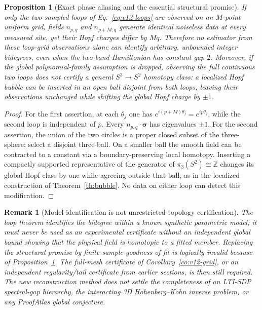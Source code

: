 \documentclass[aps,prd,onecolumn,notitlepage,11pt,superscriptaddress,longbibliography]{revtex4-2}
\newtheorem{proposition}{Proposition}
\newtheorem{remark}{Remark}
\begin{document}
\begin{proposition}[Exact phase aliasing and the essential structural promise]\label{prop:v12-alias}
If only the two sampled loops of Eq.~\eqref{eq:v12-loops} are observed on an $M$-point uniform grid, fields $n_{p,q}$ and $n_{p+M,q}$ generate \emph{identical} noiseless data at every measured site, yet their Hopf charges differ by $Mq$. Therefore no estimator from these loop-grid observations alone can identify arbitrary, unbounded integer bidegrees, even when the two-band Hamiltonian has constant gap $2$. Moreover, if the global polynomial-family assumption is dropped, observing the full \emph{continuous} two loops does not certify a general $S^3\to S^2$ homotopy class: a localized Hopf bubble can be inserted in an open ball disjoint from both loops, leaving their observations unchanged while shifting the global Hopf charge by $\pm1$.
\end{proposition}
\begin{proof}
For the first assertion, at each $\theta_j$ one has $e^{i(p+M)\theta_j}=e^{ip\theta_j}$, while the second loop is independent of $p$. Every $n_{p,q}\cdot\bm\sigma$ has eigenvalues $\pm1$. For the second assertion, the union of the two circles is a proper closed subset of the three-sphere; select a disjoint three-ball. On a smaller ball the smooth field can be contracted to a constant via a boundary-preserving local homotopy. Inserting a compactly supported representative of the generator of $\pi_3(S^2)\cong\mathbb Z$ changes its global Hopf class by one while agreeing outside that ball, as in the localized construction of Theorem~\ref{th:bubble}. No data on either loop can detect this modification.
\end{proof}

\begin{remark}[Model identification is not unrestricted topology certification]
The loop theorem identifies the bidegree within a known synthetic parametric model; it must \emph{never} be used as an experimental certificate without an independent global bound showing that the physical field is homotopic to a fitted member. Replacing the structural promise by finite-sample goodness of fit is logically invalid because of Proposition~\ref{prop:v12-alias}. The full-mesh certificate of Corollary~\ref{co:v12-grid}, or an independent regularity/tail certificate from earlier sections, is then still required. The new reconstruction method does not settle the completeness of an LTI-SDP spectral-gap hierarchy, the interacting 3D Hohenberg--Kohn inverse problem, or any ProofAtlas global conjecture.
\end{remark}
\end{document}
